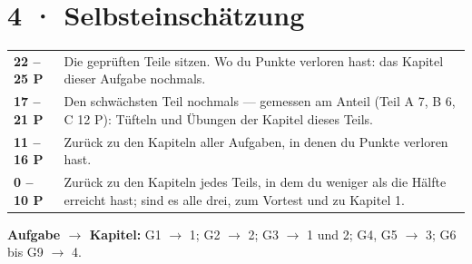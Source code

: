 \documentclass[11pt]{article}
\begin{document}
\section*{4 · Selbsteinschätzung}
\begin{tabularx}{\linewidth}{@{}l X@{}}
\toprule
\textbf{22 – 25 P} & Die geprüften Teile sitzen. Wo du Punkte verloren hast: das Kapitel dieser Aufgabe nochmals.\\
\textbf{17 – 21 P} & Den schwächsten Teil nochmals — gemessen am Anteil (Teil A 7, B 6, C 12 P): Tüfteln und Übungen der Kapitel dieses Teils.\\
\textbf{11 – 16 P} & Zurück zu den Kapiteln aller Aufgaben, in denen du Punkte verloren hast.\\
\textbf{0 – 10 P} & Zurück zu den Kapiteln jedes Teils, in dem du weniger als die Hälfte erreicht hast; sind es alle drei, zum Vortest und zu Kapitel 1.\\
\bottomrule
\end{tabularx}

\smallskip
\textbf{Aufgabe $\to$ Kapitel:} G1 $\to$ 1; G2 $\to$ 2; G3 $\to$ 1 und 2; G4, G5 $\to$ 3; G6 bis G9 $\to$ 4.
\end{document}
